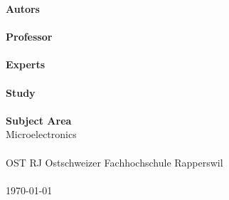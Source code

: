 \begin{titlepage}
	
	\begin{adjustwidth}{-25mm}{-45mm}
		\begin{adjustwidth}{35mm}{40mm}
			\textsf{
				\vspace*{2cm}
				\begin{flushleft}
					\Huge \textbf{\Title}\\
					\vspace{.25cm}
					\Large \sffamily\TitleInfo \\
				\end{flushleft}
			}
		\end{adjustwidth}
		
		\begin{figure}[H]
	        \centering
	        
        \end{figure}
		
		\begin{adjustwidth}{35mm}{40mm}	
			\vfill
			\large
			\textsf{\textbf{Autors}}\\
			\textsf{\Author} \\
			\textsf{\textbf{Professor}}\\
			\textsf{\Prof}\\
			\textsf{\textbf{Experts}}\\
			\textsf{\Exam}\\
			\textsf{\textbf{Study}}\\
			\textsf{\Studiengang}\\
			\textsf{\textbf{Subject Area}}\\
			\textsf{Microelectronics}\\
			\hfill\hbox{}\\
			\textsf{OST RJ Ostschweizer Fachhochschule Rapperswil}\\
			\hfill\hbox{}\\
			\textsf{\today}
            \vspace{3cm}
		\end{adjustwidth}		
	\end{adjustwidth}
\end{titlepage}
